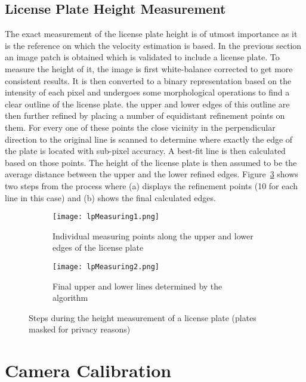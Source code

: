 \subsection{License Plate Height Measurement}

The exact measurement of the license plate height is of utmost importance as it is the reference on which the velocity estimation is based.
In the previous section an image patch is obtained which is validated to include a license plate.
To measure the height of it, the image is first white-balance corrected to get more consistent results.
It is then converted to a binary representation based on the intensity of each pixel and undergoes some morphological operations to find a clear outline of the license plate.
the upper and lower edges of this outline are then further refined by placing a number of equidistant refinement points on them.
For every one of these points the close vicinity in the perpendicular direction to the original line is scanned to determine where exactly the edge of the plate is located with sub-pixel accuracy.
A best-fit line is then calculated based on those points.
The height of the license plate is then assumed to be the average distance between the upper and the lower refined edges.
Figure~\ref{fig:lpMeasuring} shows two steps from the process where (a) displays the refinement points (10 for each line in this case) and (b) shows the final calculated edges.


\begin{figure}
    \centering
    \begin{subfigure}{.47\textwidth}
        \centering
        \texttt{[image: lpMeasuring1.png]}
        \caption{Individual measuring points along the upper and lower edges of the license plate}
        \label{fig:lpMeasuring1.png}
    \end{subfigure}%
    \hspace{.05\textwidth}
    \begin{subfigure}{.47\textwidth}
        \centering
        \texttt{[image: lpMeasuring2.png]}
        \caption{Final upper and lower lines determined by the algorithm}
        \label{fig:lpMeasuring2.png}
    \end{subfigure}
    \caption[Steps during the height measurement of a license plate]{Steps during the height measurement of a license plate (plates masked for privacy reasons)}
    \label{fig:lpMeasuring}
\end{figure}


\section{Camera Calibration}

